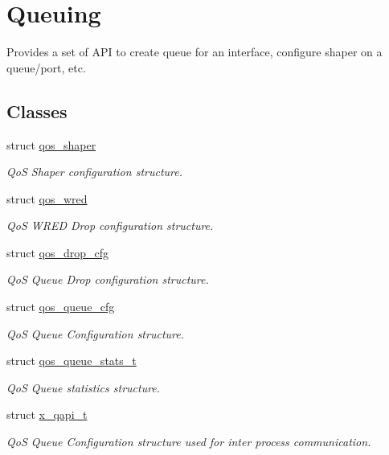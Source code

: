 \hypertarget{group__FAPI__QOS__QUEUE}{\section{Queuing}
\label{group__FAPI__QOS__QUEUE}
}


Provides a set of A\-P\-I to create queue for an interface, configure shaper on a queue/port, etc.  


\subsection*{Classes}
\begin{DoxyCompactItemize}
\item 
struct \hyperlink{structqos__shaper}{qos\-\_\-shaper}
\begin{DoxyCompactList}\small\item\em Qo\-S Shaper configuration structure. \end{DoxyCompactList}\item 
struct \hyperlink{structqos__wred}{qos\-\_\-wred}
\begin{DoxyCompactList}\small\item\em Qo\-S W\-R\-E\-D Drop configuration structure. \end{DoxyCompactList}\item 
struct \hyperlink{structqos__drop__cfg}{qos\-\_\-drop\-\_\-cfg}
\begin{DoxyCompactList}\small\item\em Qo\-S Queue Drop configuration structure. \end{DoxyCompactList}\item 
struct \hyperlink{structqos__queue__cfg}{qos\-\_\-queue\-\_\-cfg}
\begin{DoxyCompactList}\small\item\em Qo\-S Queue Configuration structure. \end{DoxyCompactList}\item 
struct \hyperlink{structqos__queue__stats__t}{qos\-\_\-queue\-\_\-stats\-\_\-t}
\begin{DoxyCompactList}\small\item\em Qo\-S Queue statistics structure. \end{DoxyCompactList}\item 
struct \hyperlink{structx__qapi__t}{x\-\_\-qapi\-\_\-t}
\begin{DoxyCompactList}\small\item\em Qo\-S Queue Configuration structure used for inter process communication. \end{DoxyCompactList}\item 

\end{DoxyCompactItemize}
